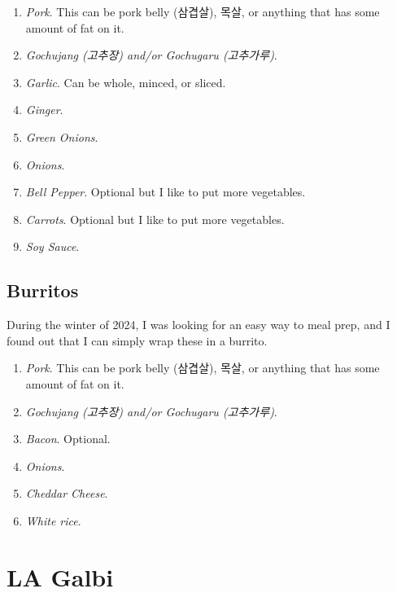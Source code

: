 \documentclass{article}
\begin{document}
  \begin{definition}
    \begin{enumerate}
      \item \textit{Pork}. This can be pork belly (삼겹살), 목살, or anything that has some amount of fat on it. 
      \item \textit{Gochujang (고추장) and/or Gochugaru (고추가루)}.  
      \item \textit{Garlic}. Can be whole, minced, or sliced. 
      \item \textit{Ginger}. 
      \item \textit{Green Onions}. 
      \item \textit{Onions}. 
      \item \textit{Bell Pepper}. Optional but I like to put more vegetables. 
      \item \textit{Carrots}. Optional but I like to put more vegetables. 
      \item \textit{Soy Sauce}. 
    \end{enumerate}
  \end{definition}

  \subsection{Burritos} 

    During the winter of 2024, I was looking for an easy way to meal prep, and I found out that I can simply wrap these in a burrito.    

    \begin{definition}
      \begin{enumerate}
        \item \textit{Pork}. This can be pork belly (삼겹살), 목살, or anything that has some amount of fat on it. 
        \item \textit{Gochujang (고추장) and/or Gochugaru (고추가루)}. 
        \item \textit{Bacon}. Optional. 
        \item \textit{Onions}. 
        \item \textit{Cheddar Cheese}. 
        \item \textit{White rice}. 
      \end{enumerate}
    \end{definition}

\section{LA Galbi}
\end{document}
